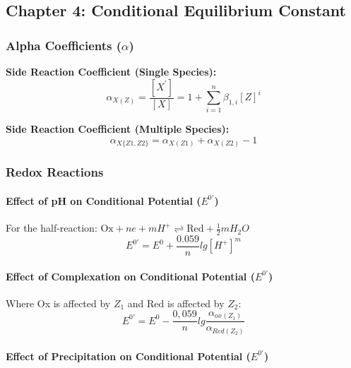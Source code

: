 \subsection*{Chapter 4: Conditional Equilibrium Constant}
\subsubsection*{Alpha Coefficients ($\alpha$)}

\textbf{Side Reaction Coefficient (Single Species):}
\begin{equation}
\alpha_{X(Z)}=\frac{[X^{\prime}]}{[X]}=1+\sum_{i=1}^{n}\beta_{1,i}[Z]^{i}
\end{equation}

\textbf{Side Reaction Coefficient (Multiple Species):}
\begin{equation}
\alpha_{X\{Z1,Z2\}}=\alpha_{X(Z1)}+\alpha_{X(Z2)}-1
\end{equation}

\subsubsection*{Redox Reactions}

\paragraph*{Effect of pH on Conditional Potential ($E^{0\prime}$)}

For the half-reaction: $\text{Ox} + ne + m H^{+} \rightleftharpoons \text{Red} + \frac{1}{2} m H_{2}O$
\begin{equation}
E^{0\prime}=E^{0}+\frac{0.059}{n}lg[H^{+}]^{m}
\end{equation}


\paragraph*{Effect of Complexation on Conditional Potential ($E^{0\prime}$)}

Where Ox is affected by $Z_1$ and Red is affected by $Z_2$:
\begin{equation}
E^{0\prime}=E^{0}-\frac{0,059}{n}lg\frac{\alpha_{ox(Z_{1})}}{\alpha_{Red(Z_{2})}}
\end{equation}


\paragraph*{Effect of Precipitation on Conditional Potential ($E^{0\prime}$)}

